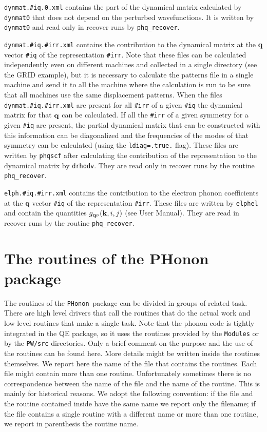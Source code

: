\documentclass[12pt,a4paper]{article}
\def\PHonon{\texttt{PHonon}}
\begin{document}
\texttt{dynmat.\#iq.0.xml} contains the part of the dynamical matrix 
calculated by \texttt{dynmat0} that does not depend on the perturbed 
wavefunctions. It is written by \texttt{dynmat0} and read only in recover runs
by \texttt{phq\_recover}.

\texttt{dynmat.\#iq.\#irr.xml}
contains the contribution to the dynamical matrix at the 
{\bf q} vector \texttt{\#iq} of
the representation \texttt{\#irr}. 
Note that these files can be calculated independently even on 
different machines and collected in a single directory (see the GRID example),
but it is necessary to calculate the patterns file in a single machine and
send it to all the machine where the calculation is run to be sure that
all machines use the same displacement patterns.
When the files \texttt{dynmat.\#iq.\#irr.xml} are present for all 
\texttt{\#irr} of a given \texttt{\#iq} the dynamical matrix for that 
${\bf q}$ can be calculated. If all the \texttt{\#irr} of a given symmetry 
for a given \texttt{\#iq} are present, 
the partial dynamical matrix that can be constructed with this information 
can be diagonalized and the frequencies of the modes of that symmetry can 
be calculated (using the \texttt{ldiag=.true.} flag).
These files are written by \texttt{phqscf} after calculating the 
contribution of the representation to the dynamical matrix by 
\texttt{drhodv}. They are read only in recover runs by the routine 
\texttt{phq\_recover}.

\texttt{elph.\#iq.\#irr.xml} contains the contribution to the electron 
phonon coefficients 
at the {\bf q} vector \texttt{\#iq} of the representation \texttt{\#irr}. 
These files are written by \texttt{elphel} and contain the quantities 
$g_{{\bf q}\nu} ({\bf k}, i, j)$ 
(see User Manual). They are read in recover runs by the routine 
\texttt{phq\_recover}.


\section{The routines of the PHonon package}

The routines of the \PHonon\ package can be divided in groups of  
related task. There are high level drivers that call the
routines that do the actual work and low level routines that make
a single task. Note that the phonon code is tightly integrated in the QE
package, so it uses the routines provided by the 
\texttt{Modules} or by the \texttt{PW/src} directories. Only a brief comment
on the purpose and the use of the routines can be found here. More details
might be written inside the routines themselves. We report here the name of the
file that contains the routines. Each file might contain more than one
routine. Unfortunately sometimes there is no correspondence between the name of
the file and the name of the routine. This is mainly for historical reasons.
We adopt the following convention: if the file and the routine contained inside
have the same name we report only the filename; if the file contains a single
routine with a different name or more than one routine, we report in 
parenthesis the routine name.
\end{document}
